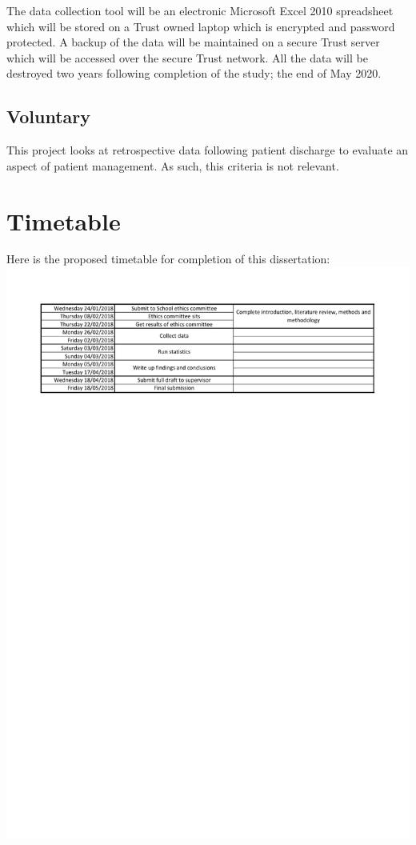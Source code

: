 \documentclass
[
	12pt,
	a4paper,
	oneside,
]{article}
\begin{document}
The data collection tool will be an electronic Microsoft Excel 2010 spreadsheet
which will be stored on a Trust owned laptop which is encrypted and password protected. A backup 
of the data will be maintained on a secure Trust server which will be accessed over
the secure Trust network. All the data will be destroyed two years following completion 
of the study; the end of May 2020.

\subsection{Voluntary}

This project looks at retrospective data following patient discharge to evaluate 
an aspect of patient management. As such, this criteria is not relevant.

\section{Timetable}
Here is the proposed timetable for completion of this dissertation:
\includegraphics[width=\textwidth]{DissertationSchedule}
\end{document}
